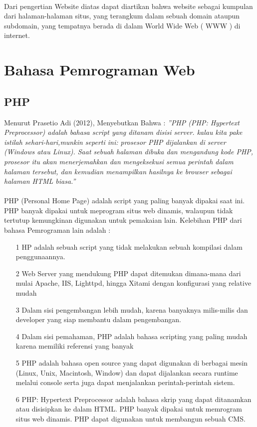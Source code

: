 \documentclass{jtetiproposalskripsi}
\begin{document}
\paragraph{}
Dari pengertian Website diatas dapat diartikan bahwa website sebagai kumpulan dari halaman-halaman situs, yang terangkum dalam sebuah domain  ataupun subdomain,  yang  tempatnya  berada  di  dalam  World  Wide  Web  (  WWW  )  di internet.

\section{Bahasa Pemrograman Web}
\subsection{PHP }
Menurut Prasetio Adi (2012), Menyebutkan Bahwa : \textit{''PHP  (PHP:  Hypertext  Preprocessor)  adalah  bahasa  script yang ditanam disisi server. kalau kita pake istilah sehari-hari,munkin seperti ini: prosesor PHP dijalankan di server (Windows atau Linux). Saat sebuah  halaman  dibuka  dan mengandung  kode  PHP,  prosesor  itu  akan menerjemahkan  dan mengeksekusi  semua  perintah  dalam  halaman  tersebut,  dan kemudian  menampilkan  hasilnya  ke  browser  sebagai halaman HTML biasa.''}
\paragraph{}
PHP  (Personal  Home  Page)  adalah  script  yang  paling  banyak  dipakai  saat  ini. PHP banyak dipakai untuk meprogram situs web dinamis, walaupun tidak tertutup kemungkinan digunakan untuk pemakaian lain. Kelebihan PHP dari bahasa Pemrograman lain adalah :
\begin{itemize}
\item[1]HP  adalah  sebuah  script  yang  tidak  melakukan  sebuah  kompilasi  dalam penggunaannya. 
\item[2]Web Server yang mendukung PHP dapat ditemukan dimana-mana dari mulai Apache,  IIS,  Lighttpd,  hingga  Xitami  dengan  konfigurasi  yang  relative mudah
\item[3]Dalam  sisi  pengembangan  lebih  mudah,  karena  banyaknya  milis-milis  dan developer yang siap membantu dalam pengembangan. 
\item[4]Dalam  sisi  pemahaman,  PHP  adalah  bahasa  scripting  yang  paling  mudah karena memiliki referensi yang banyak
\item[5]PHP  adalah  bahasa  open  source  yang  dapat  digunakan  di  berbagai  mesin (Linux,  Unix,  Macintosh,  Window)  dan  dapat  dijalankan  secara runtime melalui console serta juga dapat menjalankan perintah-perintah sistem.
\item[6]PHP: Hypertext Preprocessor adalah bahasa skrip yang dapat ditanamkan atau disisipkan  ke  dalam HTML.  PHP  banyak  dipakai  untuk  memrogram situs web dinamis. PHP dapat digunakan untuk membangun sebuah CMS.
\end{itemize}
\end{document}
